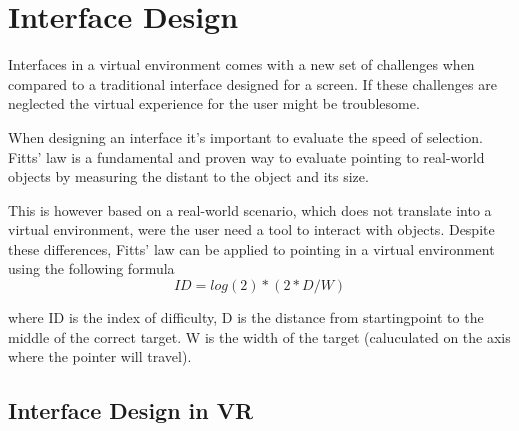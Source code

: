 \section{Interface Design}
Interfaces in a virtual environment comes with a new set of challenges when compared to a traditional interface designed for a screen. If these challenges are neglected the virtual experience for the user might be troublesome.

When designing an interface it's important to evaluate the speed of selection. Fitts' law is a fundamental and proven way to evaluate pointing to real-world objects by measuring the distant to the object and its size.\cite{interface:Fitts1954}

This is however based on a real-world scenario, which does not translate into a virtual environment, were the user need a tool to interact with objects. Despite these differences, Fitts' law can be applied to pointing in a virtual environment using the following formula  \cite{interface:card1978evaluation}
\begin{equation}
ID = log(2) * ( 2* D / W )
\end{equation}

where ID is the index of difficulty, D is the distance from startingpoint to the middle of the correct target. W is the width of the target (caluculated  on the axis where the pointer will travel).

\subsection {Interface Design in VR}
